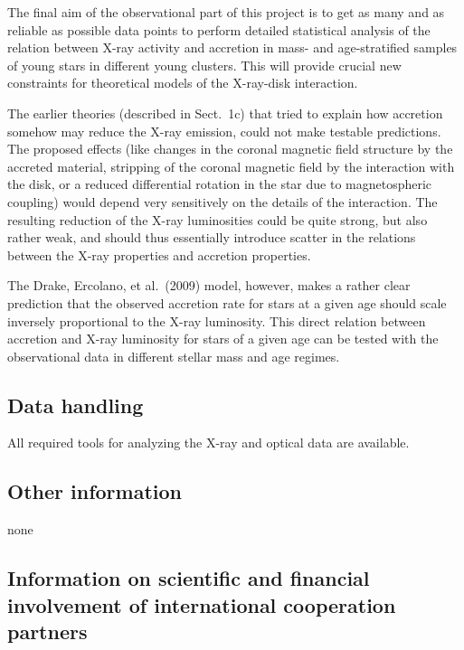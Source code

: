\documentclass[10pt,fleqn,twoside]{article}
\begin{document}
The final aim of the observational part of this project is to get as many and as reliable as 
possible data points to perform
 detailed statistical analysis
of the relation between X-ray activity and accretion in mass- and age-stratified
samples of young stars in different young clusters. This
will provide crucial new
constraints for theoretical models of the X-ray-disk interaction.


The earlier theories (described in Sect.~1c) that tried to explain how
accretion somehow may reduce the X-ray emission, 
could not make testable predictions.
The proposed effects (like changes in the coronal magnetic field structure by the
accreted material, stripping of the coronal magnetic field 
by the interaction with the disk, or a reduced differential rotation in the star
due to magnetospheric coupling) would depend very sensitively on the details
of the interaction. The resulting reduction of the X-ray luminosities could
be quite strong, but also rather weak, and should thus essentially introduce
scatter in the relations between the X-ray properties and accretion properties.

The Drake, Ercolano, et al.~(2009) model, however, makes a rather clear
prediction that the observed accretion rate for stars at a given age
should scale inversely proportional to the X-ray luminosity.
This direct relation between accretion and X-ray luminosity for stars of a given
age can be tested with
the observational data in different stellar mass and age regimes.


\subsection{Data handling}

All required tools for analyzing the X-ray and optical data are available.

\subsection{Other information}
\vspace{-2mm}

none
\vspace{-2mm}

\subsection{Information on scientific and financial involvement of international cooperation partners}
\vspace{-2mm}
\end{document}
